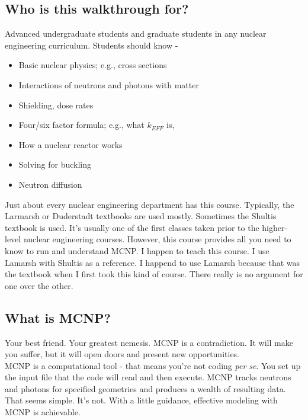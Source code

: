 \documentclass[11pt,a4paper]{article}
\begin{document}
\subsection{Who is this walkthrough for?}
\noindent Advanced undergraduate students and graduate students in any nuclear engineering curriculum. Students should know - 
\begin{itemize}[topsep=0pt,itemsep=-1ex,partopsep=1ex,parsep=1ex]
    \item Basic nuclear physics; e.g., cross sections
    \item Interactions of neutrons and photons with matter
    \item Shielding, dose rates
    \item Four/six factor formula; e.g., what $k_{EFF}$ is,
    \item How a nuclear reactor works
    \item Solving for buckling
    \item Neutron diffusion
\end{itemize}
\vspace*{\baselineskip}

\noindent Just about every nuclear engineering department has this course. Typically, the Larmarsh or Duderstadt textbooks are used mostly. Sometimes the Shultis textbook is used. It's usually one of the first classes taken prior to the higher-level nuclear engineering courses. However, this course provides all you need to know to run and understand MCNP. I happen to teach this course. I use Lamarsh with Shultis as a reference. I happend to use Lamarsh because that was the textbook when I first took this kind of course. There really is no argument for one over the other.

\subsection{What is MCNP?}
\noindent Your best friend. Your greatest nemesis. MCNP is a contradiction. It will make you suffer, but it will open doors and present new opportunities. \\

\noindent MCNP is a computational tool - that means you're not coding \textit{per se}. You set up the input file that the code will read and then execute. MCNP tracks neutrons and photons for specified geometries and produces a wealth of resulting data. That seems simple. It's not. With a little guidance, effective modeling with MCNP is achievable. 
\end{document}
